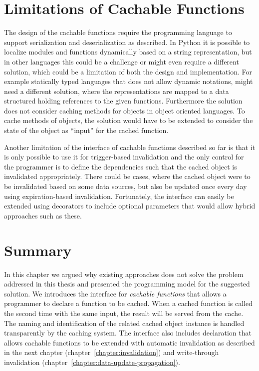 

\section{Limitations of Cachable Functions}
\label{sec:cachable-function-discussion}

The design of the cachable functions require the programming language to support serialization and deserialization as described. In Python it is possible to localize modules and functions dynamically based on a string representation, but in other languages this could be a challenge or might even require a different solution, which could be a limitation of both the design and implementation. For example statically typed languages that does not allow dynamic notations, might need a different solution, where the representations are mapped to a data structured holding references to the given functions. Furthermore the solution does not consider caching methods for objects in object oriented languages. To cache methods of objects, the solution would have to be extended to consider the state of the object as ``input'' for the cached function.

Another limitation of the interface of cachable functions described so far is that it is only possible to use it for trigger-based invalidation and the only control for the programmer is to define the dependencies such that the cached object is invalidated appropriately. There could be cases, where the cached object were to be invalidated based on some data sources, but also be updated once every day using expiration-based invalidation. Fortunately, the interface can easily be extended using decorators to include optional parameters that would allow hybrid approaches such as these.


\section{Summary}
\label{sec:cachable-functions-summary}

In this chapter we argued why existing approaches does not solve the problem addressed in this thesis and presented the programming model for the suggested solution. We introduces the interface for \emph{cachable functions} that allows a programmer to declare a function to be cached. When a cached function is called the second time with the same input, the result will be served from the cache. The naming and identification of the related cached object instance is handled transparently by the caching system. The interface also includes declaration that allows cachable functions to be extended with automatic invalidation as described in the next chapter (chapter~\ref{chapter:invalidation}) and write-through invalidation (chapter~\ref{chapter:data-update-propagation}).


